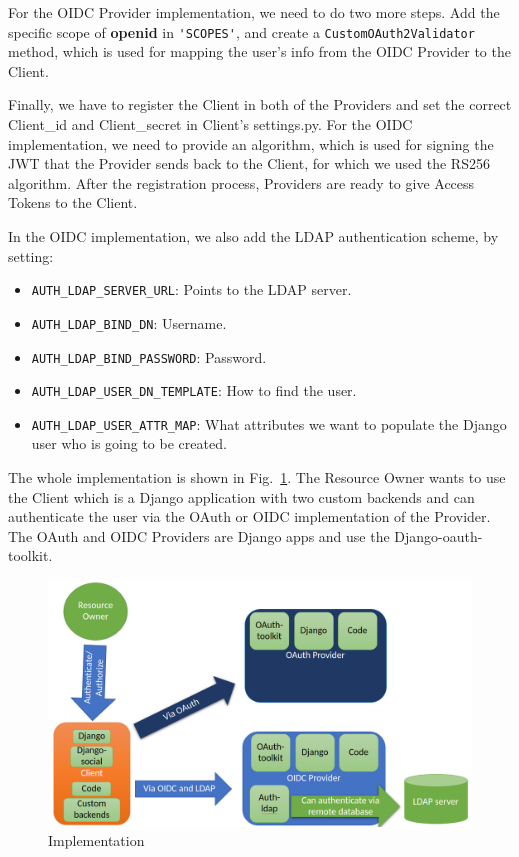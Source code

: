 For the OIDC Provider implementation, we need to do two more steps. Add the specific scope of \textbf{openid} in \verb|'SCOPES'|, and create a \verb|CustomOAuth2Validator| method, which is used for mapping the user's info from the OIDC Provider to the Client.



Finally, we have to register the Client in both of the Providers and set the correct Client\_id and Client\_secret in Client's settings.py. For the OIDC implementation, we need to provide an algorithm, which is used for signing the JWT that the Provider sends back to the Client, for which we used the RS256 algorithm. After the registration process, Providers are ready to give Access Tokens to the Client.

In the OIDC implementation, we also add the LDAP authentication scheme, by setting:

\begin{itemize}

	\item \verb|AUTH_LDAP_SERVER_URL|: Points to the LDAP server.

	\item \verb|AUTH_LDAP_BIND_DN|: Username.

	\item \verb|AUTH_LDAP_BIND_PASSWORD|: Password.

	\item \verb|AUTH_LDAP_USER_DN_TEMPLATE|: How to find the user.

	\item \verb|AUTH_LDAP_USER_ATTR_MAP|: What attributes we want to populate the Django user who is going to be created.

\end{itemize}

The whole implementation is shown in Fig.~\ref{implementation}. The Resource Owner wants to use the Client which is a Django application with two custom backends and can authenticate the user via the OAuth or OIDC implementation of the Provider. The OAuth and OIDC Providers are Django apps and use the Django-oauth-toolkit.


\begin{figure}[htb]
	\centering
	\includegraphics[scale=0.4]{figures/implementation.png}
	\caption{Implementation}\label{implementation}
\end{figure}

